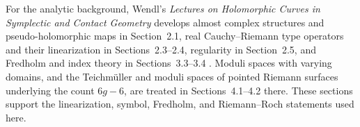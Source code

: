 For the analytic background, Wendl's
\emph{Lectures on Holomorphic Curves in Symplectic and Contact Geometry}
develops almost complex structures and pseudo-holomorphic maps in Section~2.1,
real Cauchy--Riemann type operators and their linearization in
Sections~2.3--2.4, regularity in Section~2.5, and Fredholm and index theory in
Sections~3.3--3.4
\cite{Wendl_Lectures_Holomorphic_Curves}. Moduli spaces with varying
domains, and the Teichm\"uller and moduli spaces of pointed Riemann
surfaces underlying the count $6g-6$, are treated in Sections~4.1--4.2
there. These sections support the
linearization, symbol, Fredholm, and Riemann--Roch statements used here.
